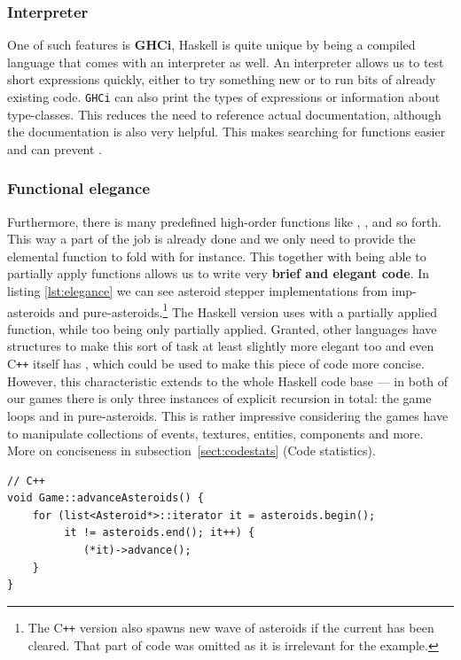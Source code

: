 \documentclass[
  digital, %
  color,   %
  table,   %
  oneside, %
  lof,     %
  lot,     %
]{fithesis3}
\newcommand{\cpp}{C\nolinebreak\texttt{+}\nolinebreak\texttt{+}}
\begin{document}
{\subsubsection{Interpreter}
One of such features is \textbf{GHCi}, \cite{ghciwiki}
Haskell is quite unique by being a compiled language that comes with an interpreter as well.
An interpreter allows us to test short expressions quickly, either to try something new or to
run bits of already existing code. \texttt{GHCi} can also print the types of expressions
or information about type-classes. This reduces the need to reference actual documentation,
although the documentation is also very helpful. \cite{hoogle} This makes searching for functions easier
and can prevent .

\subsubsection{Functional elegance}
Furthermore, there is many predefined high-order functions like
, ,  and so forth. This way a part of the
job is already done and we only need to provide the elemental function to fold with for instance.
This together with being able to partially apply functions allows us to write
very \textbf{brief and elegant code}. In listing \ref{lst:elegance} we can see asteroid stepper implementations
from imp-asteroids and pure-asteroids.\footnote{
The \cpp{} version also spawns new wave of asteroids if the current has been cleared.
That part of code was omitted as it is irrelevant for the example.
} The Haskell version uses  with a partially applied function,
while too being only partially applied. Granted, other languages have structures
to make this sort of task at least slightly more elegant too
and even \cpp{} itself has ,
which could be used to make this piece of code more concise. However, this characteristic extends
to the whole Haskell code base --- in both of our games there is only three instances
of explicit recursion in total: the game loops and  in pure-asteroids.
This is rather impressive considering the games have to manipulate collections of events,
textures, entities, components and more.
More on conciseness in subsection~\ref{sect:codestats} (Code statistics).
\begin{listing}[H]
\begin{verbatim}
// C++
void Game::advanceAsteroids() {
    for (list<Asteroid*>::iterator it = asteroids.begin();
         it != asteroids.end(); it++) {
            (*it)->advance();
    }
}
\end{verbatim}


\end{listing}}
\end{document}
